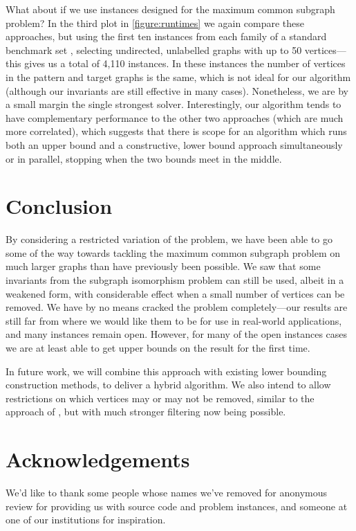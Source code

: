 \documentclass[letterpaper]{article}
\newcommand{\citet}[1]{\citeauthor{#1} \shortcite{#1}}
\newcommand{\citep}[1]{\cite{#1}}
\theoremstyle{definition}
\begin{document}
What about if we use instances designed for the maximum common subgraph problem? In the third plot
in \cref{figure:runtimes} we again compare these approaches, but using the first ten instances from
each family of a standard benchmark set
\citep{DBLP:journals/prl/SantoFSV03,DBLP:journals/jgaa/ConteFV07}, selecting undirected, unlabelled
graphs with up to 50 vertices---this gives us a total of 4,110 instances. In these instances the
number of vertices in the pattern and target graphs is the same, which is not ideal for our
algorithm (although our invariants are still effective in many cases). Nonetheless, we are by a
small margin the single strongest solver. Interestingly, our algorithm tends to have complementary
performance to the other two approaches (which are much more correlated), which suggests that there
is scope for an algorithm which runs both an upper bound and a constructive, lower bound approach
simultaneously or in parallel, stopping when the two bounds meet in the middle.

\section{Conclusion}

By considering a restricted variation of the problem, we have been able to go some of the way
towards tackling the maximum common subgraph problem on much larger graphs than have previously been
possible. We saw that some invariants from the subgraph isomorphism problem can still be used,
albeit in a weakened form, with considerable effect when a small number of vertices can be removed.
We have by no means cracked the problem completely---our results are still far from where we
would like them to be for use in real-world applications, and many instances remain open. However,
for many of the open instances cases we are at least able to get upper bounds on the result for the
first time.

In future work, we will combine this approach with existing lower bounding construction methods, to
deliver a hybrid algorithm. We also intend to allow restrictions on which vertices may or may not be
removed, similar to the approach of \citet{DBLP:conf/cp/ZampelliDD05}, but with much stronger
filtering now being possible.

\section*{Acknowledgements}

We'd like to thank some people whose names we've removed for anonymous review for providing us with
source code and problem instances, and someone at one of our institutions for inspiration.
\end{document}
